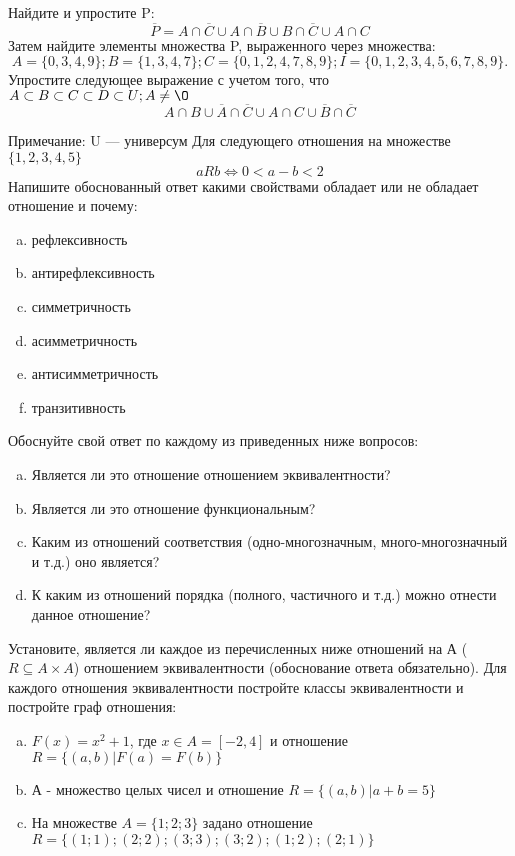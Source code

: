 \documentclass[10pt]{exam}
\begin{document}
\begin{questions}
\question
Найдите и упростите P:
\begin{equation*}
\overline{P} = A \cap \overline{C} \cup A \cap \overline{B} \cup B \cap \overline{C} \cup A \cap C
\end{equation*}
Затем найдите элементы множества P, выраженного через множества:
\begin{equation*}
A = \{0, 3, 4, 9\}; 
B = \{1, 3, 4, 7\};
C = \{0, 1, 2, 4, 7, 8, 9\};
I = \{0, 1, 2, 3, 4, 5, 6, 7, 8, 9\}.
\end{equation*}\question
Упростите следующее выражение с учетом того, что $A\subset B \subset C \subset D \subset U; A \neq \O$
\begin{equation*}
A \cap B \cup \overline{A} \cap \overline{C} \cup A \cap C \cup \overline{B} \cap \overline{C}
\end{equation*}

Примечание: U — универсум\question
Для следующего отношения на множестве $\{1, 2, 3, 4, 5\}$ 
\begin{equation*}
aRb \iff 0 < a-b<2
\end{equation*}
Напишите обоснованный ответ какими свойствами обладает или не обладает отношение и почему:   
\begin{enumerate} [a)]\setcounter{enumi}{0}
\item рефлексивность
\item антирефлексивность
\item симметричность
\item асимметричность
\item антисимметричность
\item транзитивность
\end{enumerate}

Обоснуйте свой ответ по каждому из приведенных ниже вопросов:
\begin{enumerate} [a)]\setcounter{enumi}{0}
    \item Является ли это отношение отношением эквивалентности?
    \item Является ли это отношение функциональным?
    \item Каким из отношений соответствия (одно-многозначным, много-многозначный и т.д.) оно является?
    \item К каким из отношений порядка (полного, частичного и т.д.) можно отнести данное отношение?
\end{enumerate}
\question
Установите, является ли каждое из перечисленных ниже отношений на А ($R \subseteq A \times A$) отношением эквивалентности (обоснование ответа обязательно). Для каждого отношения эквивалентности постройте классы эквивалентности и постройте граф отношения:
\begin{enumerate} [a)]\setcounter{enumi}{0}
\item $F(x)=x^{2}+1$, где $x \in A = [-2, 4]$ и отношение $R = \{(a,b)|F(a) = F(b)\}$
\item А - множество целых чисел и отношение $R = \{(a,b)|a + b = 5\}$
\item На множестве $A = \{1; 2; 3\}$ задано отношение $R = \{(1; 1); (2; 2); (3; 3); (3; 2); (1; 2); (2; 1)\}$


\end{enumerate}
\end{questions}
\end{document}

